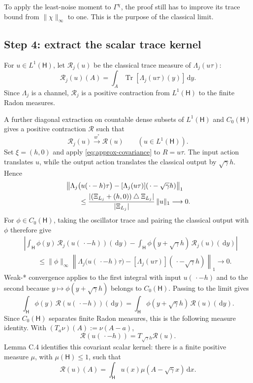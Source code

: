 \documentclass[11pt]{article}
\newcommand{\Hc}{\mathsf H}
\newcommand{\Tr}{\operatorname{Tr}}
\newcommand{\dd}{\,\mathrm d}
\begin{document}
To apply the least-noise moment to $\Gamma^\chi$, the proof still has to
improve its trace bound from $\|\chi\|_\infty$ to one.  This is the purpose
of the classical limit.

\subsection*{Step 4: extract the scalar trace kernel}

For $u\in L^1(\Hc)$, let $\mathcal R_j(u)$ be the classical trace measure of
$\Lambda_j(u\tau)$:
\begin{equation}\label{eq:Rj}
  \mathcal R_j(u)(A)
  =\int_A\Tr[\Lambda_j(u\tau)(y)]\dd y.
\end{equation}
Since $\Lambda_j$ is a channel, $\mathcal R_j$ is a positive contraction
from $L^1(\Hc)$ to the finite Radon measures.

A further diagonal extraction on countable dense subsets of $L^1(\Hc)$ and
$C_0(\Hc)$ gives a positive contraction $\mathcal R$ such that
\[
  \mathcal R_j(u)\stackrel{w^*}{\longrightarrow}\mathcal R(u)
  \qquad(u\in L^1(\Hc)).
\]
Set $\xi=(h,0)$ and apply \eqref{eq:approx-covariance} to
$R=u\tau$.  The input action translates \(u\), while the output action
translates the classical output by \(\sqrt\gamma h\).  Hence
\begin{align}
 &\left\|
   \Lambda_j\bigl(u(\,\cdot-h)\tau\bigr)
   -[\Lambda_j(u\tau)](\,\cdot-\sqrt\gamma h)
  \right\|_1\notag\\
 &\qquad\leq
  \frac{|(\Xi_{L_j}+(h,0))\mathbin\triangle\Xi_{L_j}|}
       {|\Xi_{L_j}|}\,\|u\|_1
  \longrightarrow0.
  \label{eq:scalar-approx-covariance}
\end{align}
For \(\phi\in C_0(\Hc)\), taking the oscillator trace and pairing the
classical output with \(\phi\) therefore give
\[
\begin{aligned}
 &\left|
   \int_{\Hc}\phi(y)\,\mathcal R_j(u(\,\cdot-h))(\dd y)
   -\int_{\Hc}\phi(y+\sqrt\gamma h)\,\mathcal R_j(u)(\dd y)
  \right|\\
 &\qquad\leq
  \|\phi\|_\infty
  \left\|
   \Lambda_j\bigl(u(\,\cdot-h)\tau\bigr)
   -[\Lambda_j(u\tau)](\,\cdot-\sqrt\gamma h)
  \right\|_1
  \longrightarrow0.
\end{aligned}
\]
Weak-* convergence applies to the first integral with input
\(u(\,\cdot-h)\) and to the second because
\(y\mapsto\phi(y+\sqrt\gamma h)\) belongs to \(C_0(\Hc)\).  Passing to the
limit gives
\[
  \int_{\Hc}\phi(y)\,\mathcal R(u(\,\cdot-h))(\dd y)
  =\int_{\Hc}\phi(y+\sqrt\gamma h)\,\mathcal R(u)(\dd y).
\]
Since \(C_0(\Hc)\) separates finite Radon measures, this is the following
measure identity.  With $(T_a\nu)(A):=\nu(A-a)$,
\begin{equation}\label{eq:R-covariance}
  \mathcal R(u(\,\cdot-h))
  =T_{\sqrt\gamma h}\mathcal R(u).
\end{equation}
Lemma C.4 identifies this covariant scalar kernel: there is a finite positive
measure $\mu$, with $\mu(\Hc)\leq1$, such that
\begin{equation}\label{eq:convolution}
  \mathcal R(u)(A)
  =\int_{\Hc}u(x)\mu(A-\sqrt\gamma x)\dd x.
\end{equation}
\end{document}
